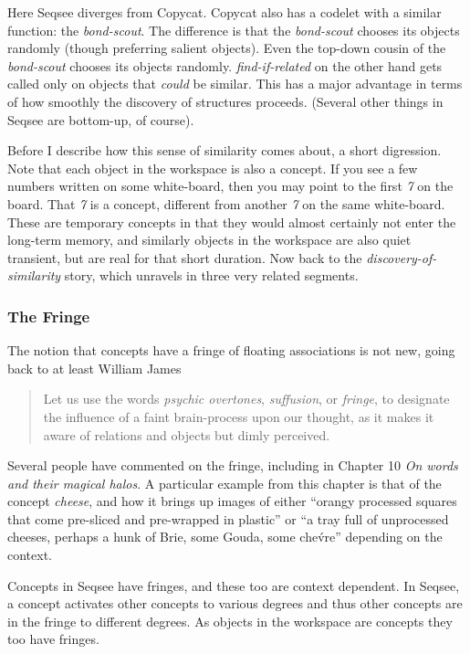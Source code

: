 \documentclass[letterpaper]{article}
\begin{document}
Here Seqsee diverges from Copycat.  Copycat also has a codelet with a similar function: the \emph{bond-scout}.  The difference is that the \emph{bond-scout} chooses its objects randomly (though preferring salient objects).  Even the top-down cousin of the \emph{bond-scout} chooses its objects randomly.  \emph{find-if-related} on the other hand gets called only on objects that \emph{could} be similar.  This has a major advantage in terms of how smoothly the discovery of structures proceeds.  (Several other things in Seqsee are bottom-up, of course).

Before I describe how this sense of similarity comes about, a short digression. Note that each object in the workspace is also a concept.  If you see a few numbers written on some white-board, then you may point to the first \emph{7} on the board.  That \emph{7} is a concept, different from another \emph{7} on the same white-board.  These are temporary concepts in that they would almost certainly not enter the long-term memory, and similarly objects in the workspace are also quiet transient, but are real for that short duration. Now back to the \emph{discovery-of-similarity} story, which unravels in three very related segments.

\subsubsection{The Fringe}
\label{sec:fringe}

The notion that concepts have a fringe of floating associations is not new, going back to at least William James \cite{James}

\begin{quote}
  Let us use the words \emph{psychic overtones}, \emph{suffusion}, or \emph{fringe}, to designate the influence of a faint brain-process upon our thought, as it makes it aware of relations and objects but dimly perceived.
\end{quote}

  Several people have commented on the fringe, including  in Chapter 10 \emph{On words and their magical halos}. A particular example from this chapter is that of the concept \emph{cheese}, and how it brings up images of either ``orangy processed squares that come pre-sliced and pre-wrapped in plastic'' or ``a tray full of unprocessed cheeses, perhaps a hunk of Brie, some Gouda, some che\'vre'' depending on the context.

Concepts in Seqsee have fringes, and these too are context dependent. In Seqsee, a concept activates other concepts to various degrees and thus other concepts are in the fringe to different degrees. As objects in the workspace are concepts they too have fringes.
\end{document}
